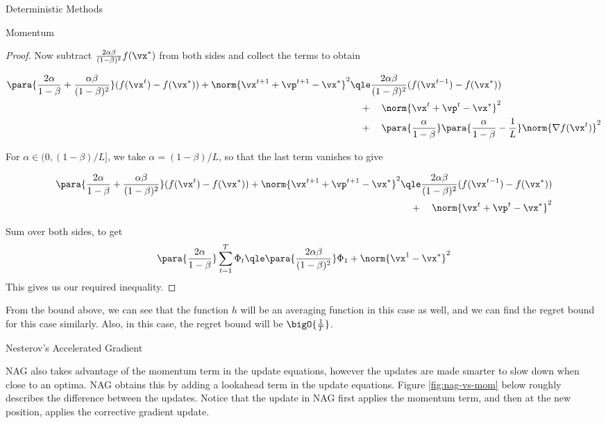 \documentclass{article}
\begin{document}
\begin{psection}{Deterministic Methods}
\begin{psubsection}{Momentum}
\begin{theorem}
\begin{proof}
			Now subtract $\frac{2\alpha\beta}{(1-\beta)^2}f(\vx^*)$ from both sides and collect the terms to obtain

			\begin{align*}
				\para{\frac{2\alpha}{1-\beta}+\frac{\alpha\beta}{(1-\beta)^2}}(f(\vx^t)-f(\vx^*)) +\norm{\vx^{t+1}+\vp^{t+1}-\vx^*}^2 &\qle \frac{2\alpha\beta}{(1-\beta)^2}(f(\vx^{t-1})-f(\vx^*)) \\
				&\quad+\quad\norm{\vx^{t}+\vp^{t}-\vx^*}^2\\
				&\quad+\quad\para{\frac{\alpha}{1-\beta}}\para{\frac{\alpha}{1-\beta}-\frac{1}{L}}\norm{\nabla f(\vx^t)}^2
			\end{align*}

			For $\alpha\in(0,(1-\beta)/L]$, we take $\alpha=(1-\beta)/L$, so that the last term vanishes to give

			\begin{align*}
				\para{\frac{2\alpha}{1-\beta}+\frac{\alpha\beta}{(1-\beta)^2}}(f(\vx^t)-f(\vx^*)) +\norm{\vx^{t+1}+\vp^{t+1}-\vx^*}^2 &\qle \frac{2\alpha\beta}{(1-\beta)^2}(f(\vx^{t-1})-f(\vx^*)) \\
				&\quad+\quad \norm{\vx^{t}+\vp^{t}-\vx^*}^2
			\end{align*}

			Sum over both sides, to get
			\begin{align*}
				\para{\frac{2\alpha}{1-\beta}}\sum_{t=1}^{T}\Phi_t\qle\para{\frac{2\alpha\beta}{(1-\beta)^2}}\Phi_1 + \norm{\vx^1-\vx^*}^2
			\end{align*}
			This gives us our required inequality.
		\end{proof}
	\end{theorem}

	From the bound above, we can see that the function $h$ will be an averaging function in this case as well, and we can find the regret bound for this case similarly. Also, in this case, the regret bound will be $\bigO{\frac{1}{T}}$.

\end{psubsection}

\begin{psubsection}{Nesterov's Accelerated Gradient}

	NAG also takes advantage of the momentum term in the update equations, however the updates are made smarter to slow down when close to an optima. NAG obtains this by adding a lookahead term in the update equations. Figure \ref{fig:nag-vs-mom} below roughly describes the difference between the updates. Notice that the update in NAG first applies the momentum term, and then at the new position, applies the corrective gradient update.


\end{psubsection}
\end{psection}
\end{document}
